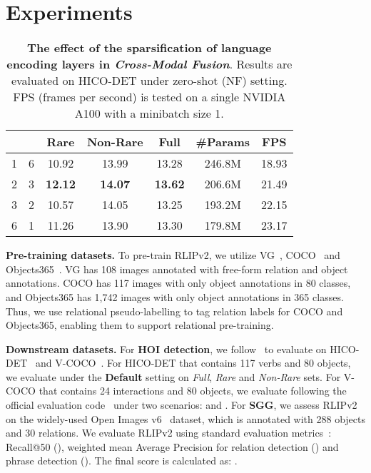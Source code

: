 \section{Experiments} \label{sec:experiments}


\begin{table}[t]
\setlength{\tabcolsep}{3pt}
  \centering
    \begin{tabular}{cc|ccc|cc}
    \toprule
     &  & \textbf{Rare} & \textbf{Non-Rare} & \textbf{Full} & \textbf{\#Params} & \textbf{FPS} \\
    \midrule
    \midrule
    1     & 6     & 10.92  & 13.99  & 13.28  & 246.8M & 18.93 \\
    2     & 3     & \textbf{12.12} & \textbf{14.07} & \textbf{13.62} & 206.6M & 21.49 \\
    3     & 2     & 10.57  & 14.05  & 13.25  & 193.2M & 22.15 \\
    6     & 1     & 11.26  & 13.90  & 13.30  & 179.8M & 23.17 \\
    \bottomrule
    \end{tabular}
    \vspace{-.1cm}
    \caption{\small \textbf{The effect of the sparsification of language encoding layers in \textit{Cross-Modal Fusion}}. Results are evaluated on HICO-DET under zero-shot (NF) setting. FPS (frames per second) is tested on a single NVIDIA A100 with a minibatch size 1.}
    \vspace{-.2cm}
  \label{tab:sparsification_language_encoder}
\end{table}

\textbf{Pre-training datasets.}
To pre-train RLIPv2, we utilize VG~\cite{krishna2017visualgenome}, COCO~\cite{lin2014MSCOCO} and Objects365~\cite{shao2019Objects365}.
VG has 108 images annotated with free-form relation and object annotations.
COCO has 117 images with only object annotations in 80 classes, and Objects365 has 1,742 images with only object annotations in 365 classes.
Thus, we use relational pseudo-labelling to tag relation labels for COCO and Objects365, enabling them to support relational pre-training.




\textbf{Downstream datasets.} 
For \textbf{HOI detection}, we follow~\cite{tamura2021qpic,Yuan2022RLIP,Yuan2022OCN,zhang2021CDN} to evaluate on HICO-DET~\cite{chao2015hico} and V-COCO~\cite{gupta2015VisualSemanticRole}.
For HICO-DET that contains 117 verbs and 80 objects, we evaluate under the \textbf{Default} setting on \textit{Full}, \textit{Rare} and \textit{Non-Rare} sets.
For V-COCO that contains 24 interactions and 80 objects, we evaluate following the official evaluation code~\cite{gupta2015VisualSemanticRole} under two scenarios:   and .
For \textbf{SGG}, we assess RLIPv2 on the widely-used Open Images v6~\cite{kuznetsova2020open_image} dataset, which is annotated with 288 objects and 30 relations.
We evaluate RLIPv2 using standard evaluation metrics~\cite{kuznetsova2020open_image,zhang2019RelDN}: 
Recall@50 (), weighted mean Average Precision for relation detection () and phrase detection ().
The final score is calculated as:
.







